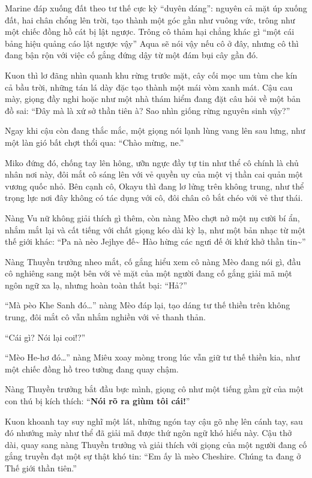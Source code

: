 \documentclass[../main.tex]{subfiles}
\begin{document}
Marine đáp xuống đất theo tư thế cực kỳ ``duyên dáng'': nguyên cả mặt úp xuống đất, hai chân chổng lên trời, tạo thành một góc gần như vuông vức, trông như một chiếc đồng hồ cát bị lật ngược. Trông cô thảm hại chẳng khác gì ``một cái bảng hiệu quảng cáo lật ngược vậy'' Aqua sẽ nói vậy nếu cô ở đây, nhưng cô thì đang bận rộn với việc cố gắng đứng dậy từ một đám bụi cây gần đó.


Kuon thì lơ đãng nhìn quanh khu rừng trước mặt, cây cối mọc um tùm che kín cả bầu trời, những tán lá dày đặc tạo thành một mái vòm xanh mát. Cậu cau mày, giọng đầy nghi hoặc như một nhà thám hiểm đang đặt câu hỏi về một bản đồ sai: ``Đây mà là xứ sở thần tiên à? Sao nhìn giống rừng nguyên sinh vậy?''

Ngay khi cậu còn đang thắc mắc, một giọng nói lạnh lùng vang lên sau lưng, như một làn gió bất chợt thổi qua: ``Chào mừng, ne.''

Miko đứng đó, chống tay lên hông, ưỡn ngực đầy tự tin như thể cô chính là chủ nhân nơi này, đôi mắt cô sáng lên với vẻ quyền uy của một vị thần cai quản một vương quốc nhỏ. Bên cạnh cô, Okayu thì đang lơ lửng trên không trung, như thể trọng lực nơi đây không có tác dụng với cô, đôi chân cô bắt chéo với vẻ thư thái.

Nàng Vu nữ không giải thích gì thêm, còn nàng Mèo chợt nở một nụ cười bí ẩn, nhắm mắt lại và cất tiếng với chất giọng kéo dài kỳ lạ, như một bản nhạc từ một thế giới khác: ``Pa nà nèo Jejhye đế\~{} Hào hừng các ngưi đế ới khứ khở thần tin\~{}''

Nàng Thuyền trưởng nheo mắt, cố gắng hiểu xem cô nàng Mèo đang nói gì, đầu cô nghiêng sang một bên với vẻ mặt của một người đang cố gắng giải mã một ngôn ngữ xa lạ, nhưng hoàn toàn thất bại: ``Hả?''

``Mà pèo Khe Sanh đó\dots'' nàng Mèo đáp lại, tạo dáng tư thế thiền trên không trung, đôi mắt cô vẫn nhắm nghiền với vẻ thanh thản.

``Cái gì? Nói lại coi!?''

``Mèo He-hơ đó\dots'' nàng Miêu xoay mòng trong lúc vẫn giữ tư thế thiền kia, như một chiếc đồng hồ treo tường đang quay chậm.

Nàng Thuyền trưởng bắt đầu bực mình, giọng cô như một tiếng gầm gừ của một con thú bị kích thích: ``\textbf{Nói rõ ra giùm tôi cái!}''

Kuon khoanh tay suy nghĩ một lát, những ngón tay cậu gõ nhẹ lên cánh tay, sau đó nhướng mày như thể đã giải mã được thứ ngôn ngữ khó hiểu này. Cậu thở dài, quay sang nàng Thuyền trưởng và giải thích với giọng của một người đang cố gắng truyền đạt một sự thật khó tin: ``Em ấy là mèo Cheshire. Chúng ta đang ở Thế giới thần tiên.''
\end{document}
